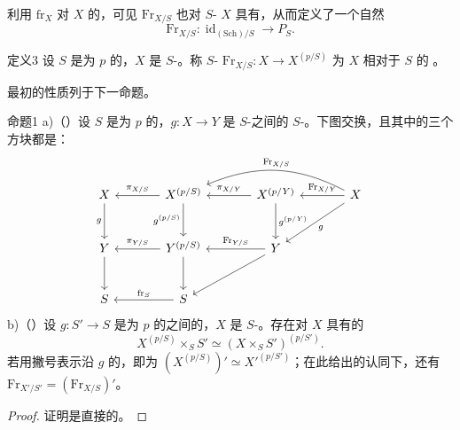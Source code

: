 利用 $\mathrm{fr}_X$ 对 $X$ 的，可见 $\mathrm{Fr}_{X/S}$ 也对 $S$- $X$ 具有，从而定义了一个自然
\[
\mathrm{Fr}_{X/S}:\operatorname{id}_{(\mathrm{Sch})/S}\longrightarrow P_S.
\]
\begin{SGAresult}{定义}{3}
设 $S$ 是为 $p$ 的，$X$ 是 $S$-。称 $S$- $\mathrm{Fr}_{X/S}:X\to X^{(p/S)}$ 为 $X$ 相对于 $S$ 的 。
\end{SGAresult}
最初的性质列于下一命题。
\begin{SGAresult}{命题}{1}
a)（）设 $S$ 是为 $p$ 的，$g:X\to Y$ 是 $S$-之间的 $S$-。下图交换，且其中的三个方块都是：
\[
\begin{tikzcd}[column sep=large,row sep=large]
X\arrow[d,"g"']&X^{(p/S)}\arrow[l,"\pi_{X/S}"']\arrow[d,"g^{(p/S)}"']&X^{(p/Y)}\arrow[l,"\pi_{X/Y}"']\arrow[d,"g^{(p/Y)}"]&X\arrow[l,"\mathrm{Fr}_{X/Y}"']\arrow[ll,bend right=25,"\mathrm{Fr}_{X/S}"']\arrow[dl,"g"]\\
Y\arrow[d]&Y^{(p/S)}\arrow[l,"\pi_{Y/S}"']\arrow[d]&Y\arrow[l,"\mathrm{Fr}_{Y/S}"']\arrow[dl]&\\
S&S\arrow[l,"\mathrm{fr}_S"']&&
\end{tikzcd}
\]
b)（）设 $g:S'\to S$ 是为 $p$ 的之间的，$X$ 是 $S$-。存在对 $X$ 具有的
\[
X^{(p/S)}\times_SS'\simeq(X\times_SS')^{(p/S')}.
\]
若用撇号表示沿 $g$ 的，即为 $(X^{(p/S)})'\simeq X'^{(p/S')}$；在此给出的认同下，还有 $\mathrm{Fr}_{X'/S'}=(\mathrm{Fr}_{X/S})'$。
\end{SGAresult}
\begin{proof}证明是直接的。\end{proof}
